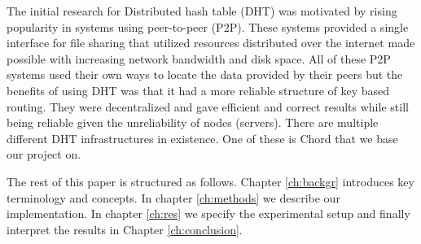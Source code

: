 The initial research for Distributed hash table (DHT) was motivated by rising popularity in systems using peer-to-peer (P2P). These systems provided a single interface for file sharing that utilized resources distributed over the internet made possible with increasing network bandwidth and disk space. All of these P2P systems used their own ways to locate the data provided by their peers but the benefits of using DHT was that it had a more reliable structure of key based routing. They were decentralized and gave efficient and correct results while still being reliable given the unreliability of nodes (servers).\cite{DHT-History} There are multiple different DHT infrastructures in existence. One of these is Chord \cite{chord-peer-to-peer} that we base our project on.

The rest of this paper is structured as follows. Chapter \ref{ch:backgr} introduces key terminology and concepts. In chapter \ref{ch:methods} we describe our implementation. In chapter \ref{ch:res} we specify the experimental setup and finally interpret the results in Chapter \ref{ch:conclusion}.

